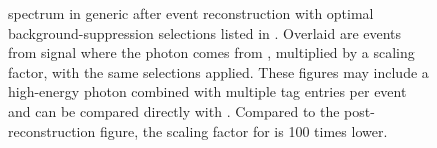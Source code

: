 \begin{figure}[htbp!]
    \centering
    \caption{\label{fig:spectrum_after_optimisation}
    \BtoXsgamma spectrum in generic \MC after event reconstruction with optimal background-suppression selections listed in .
    Overlaid are events from signal \MC where the photon comes from \BtoXsgamma, multiplied by a scaling factor, with the same selections applied.
    These figures may include a high-energy photon combined with multiple tag entries per event and can be compared directly with .
    Compared to the post-reconstruction figure, the scaling factor for \BtoXsgamma is 100 times lower.}
\end{figure}
